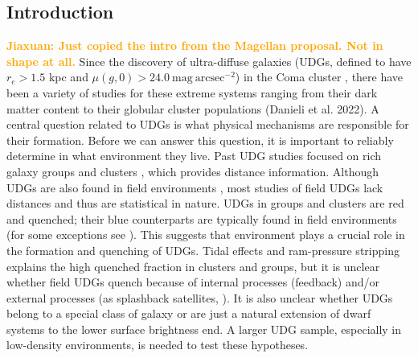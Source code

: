 \documentclass[twocolumn,astrosymb,twocolappendix]{aastex631}
\newcommand{\jiaxuan}[1]{\textcolor{orange}{\textbf{Jiaxuan: #1}}}
\begin{document}
\begin{CJK*}{UTF8}{gbsn}

\begin{abstract}

\end{abstract}



\section{Introduction} \label{sec:intro}

\jiaxuan{Just copied the intro from the Magellan proposal. Not in shape at all.}
Since the discovery of ultra-diffuse galaxies (UDGs, defined to have $r_e > 1.5$ kpc and $\mu(g,0)>24.0\ \mathrm{mag\ arcsec^{-2}}$) in the Coma cluster \citep{vanDokkum2015}, there have been a variety of studies for these extreme systems ranging from their dark matter content \citep{vanDokkum2018,vanDokkum2019} to their globular cluster populations (Danieli et al. 2022). A central question related to UDGs is what physical mechanisms are responsible for their formation. Before we can answer this question, it is important to reliably determine in what environment they live.
Past UDG studies focused on rich galaxy groups and clusters \citep[e.g.,][]{Yagi2016,Zaritsky2019}, which provides distance information. Although UDGs are also found in field environments \citep{Prole2019,Tanoglidis2021,Kadowaki2021}, most studies of field UDGs lack distances and thus are statistical in nature. UDGs in groups and clusters are red and quenched; their blue counterparts are typically found in field environments (for some exceptions see \citealt{Roman2019,Prole2019}). This suggests that environment plays a crucial role in the formation and quenching of UDGs. Tidal effects and ram-pressure stripping explains the high quenched fraction in clusters and groups, but it is unclear whether field UDGs quench because of internal processes (feedback) and/or external processes (as splashback satellites, \citealt{Benavides2021}). It is also unclear whether UDGs belong to a special class of galaxy or are just a natural extension of dwarf systems to the lower surface brightness end. A larger UDG sample, especially in low-density environments, is needed to test these hypotheses.



\end{CJK*}
\end{document}

